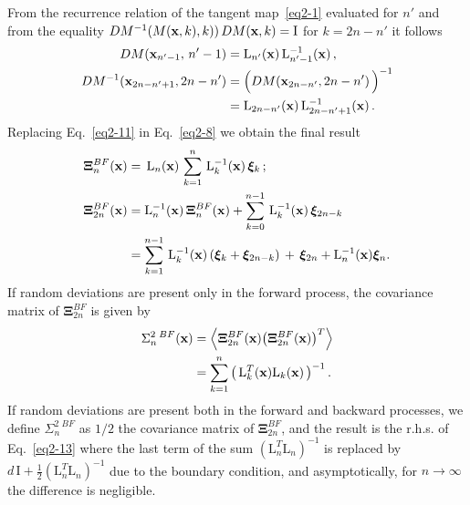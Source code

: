 From the recurrence relation of the tangent map~\eqref{eq2-1} evaluated for $n'$ and from the equality $DM^{-1}(M(\vb{x},k),k))\,DM(\vb{x},k)=\mathrm{I}$ for $k=2n-n'$ it follows 
%
\begin{equation}
  \begin{split}
  DM(\vb{x}_{n'-1},\,n'-1) &= \mathrm{L}_{n'}(\vb{x})\,\mathrm{L}_{n'-1}^{-1}(\vb{x}) \, , \\
  DM^{-1}(\vb{x}_{2n-n' +1},2n-n') &= \Bigl(DM(\vb{x}_{2n-n'},2n-n')\,\Bigr)^{-1} \\
  &= \mathrm{L}_{2n-n'}(\vb{x})\,\mathrm{L}^{-1}_{2n-n'+1}(\vb{x}) \, .
  \end{split}
\label{eq2-11}
\end{equation}
%
Replacing Eq.~\eqref{eq2-11} in Eq.~\eqref{eq2-8} we obtain the final result
%
\begin{equation}
  \begin{split}
    \boldsymbol{\Xi}_{n}^{BF}(\vb{x}) & = \,\mathrm{L}_n(\vb{x})\,\sum_{k=1}^n\,\mathrm{L}_k^{-1}(\vb{x}) \,\boldsymbol{\xi}_k \,; \\  
     \boldsymbol{\Xi}_{2n}^{BF}(\vb{x}) &= \mathrm{L}_n^{-1}(\vb{x})\,\boldsymbol{\Xi}_{n}^{BF}(\vb{x})+ \sum_{k=0}^{n-1}\,\mathrm{L}^{-1}_k(\vb{x})\,
    \boldsymbol{\xi}_{2n-k} \\ %
    &  =\sum_{k=1}^{n-1}\,\mathrm{L}_k^{-1}(\vb{x})\,(\boldsymbol{\xi}_k+\boldsymbol{\xi}_{2n-k}) \,+
   \,\boldsymbol{\xi}_{2n}+ \mathrm{L}_n^{-1}(\vb{x}) \boldsymbol{\xi}_n .
   \end{split}
\label{eq2-12}
\end{equation}
%
If random deviations are present only in the forward process, the covariance matrix of $\boldsymbol{\Xi}^{BF}_{2n}$ is given by 
%
\begin{equation}
  \begin{split}
    \Sigma^{2\,\,BF}_n(\vb{x}) &= \left\langle{{  \boldsymbol{\Xi}^{BF}_{2n}(\vb{x})\bigl(\boldsymbol{\Xi}^{BF}_{2n}(\vb{x})\bigr)^T}}\right\rangle \\
    &=\sum_{k=1}^n \,\bigl( \,\mathrm{L}_k^T(\vb{x})\mathrm{L}_k(\vb{x})\,\bigr)^{-1}\, .
   \end{split}
\label{eq2-13}
\end{equation}
%
If random deviations are present both in the forward and backward processes, we define $\Sigma^{2\,\,BF}_n$ as $1/2$ the covariance matrix of $\boldsymbol{\Xi}^{BF}_{2n}$, and the result is the r.h.s. of Eq.~\eqref{eq2-13} where the last term of the sum $(\mathrm{L}_n^T\mathrm{L}_n)^{-1}$ is replaced by $d\, \mathrm{I}+\frac{1}{2} (\mathrm{L}_n^T\mathrm{L}_n)^{-1}$ due to the boundary condition, and asymptotically, for $n\to \infty$ the difference is negligible. 


